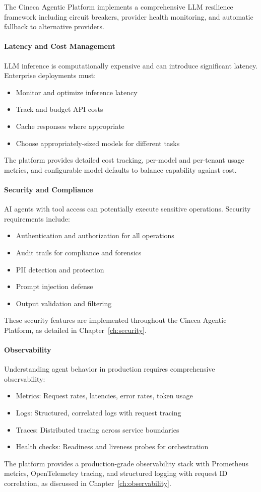 The Cineca Agentic Platform implements a comprehensive LLM resilience framework including circuit breakers, provider health monitoring, and automatic fallback to alternative providers.

\paragraph{Latency and Cost Management}
LLM inference is computationally expensive and can introduce significant latency. Enterprise deployments must:
\begin{itemize}
    \item Monitor and optimize inference latency
    \item Track and budget API costs
    \item Cache responses where appropriate
    \item Choose appropriately-sized models for different tasks
\end{itemize}

The platform provides detailed cost tracking, per-model and per-tenant usage metrics, and configurable model defaults to balance capability against cost.

\paragraph{Security and Compliance}
AI agents with tool access can potentially execute sensitive operations. Security requirements include:
\begin{itemize}
    \item Authentication and authorization for all operations
    \item Audit trails for compliance and forensics
    \item PII detection and protection
    \item Prompt injection defense
    \item Output validation and filtering
\end{itemize}

These security features are implemented throughout the Cineca Agentic Platform, as detailed in Chapter~\ref{ch:security}.

\paragraph{Observability}
Understanding agent behavior in production requires comprehensive observability:
\begin{itemize}
    \item Metrics: Request rates, latencies, error rates, token usage
    \item Logs: Structured, correlated logs with request tracing
    \item Traces: Distributed tracing across service boundaries
    \item Health checks: Readiness and liveness probes for orchestration
\end{itemize}

The platform provides a production-grade observability stack with Prometheus metrics, OpenTelemetry tracing, and structured logging with request ID correlation, as discussed in Chapter~\ref{ch:observability}.
